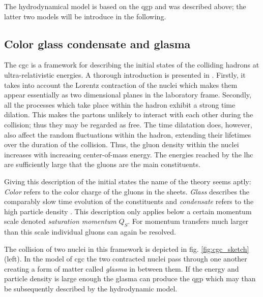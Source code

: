 The hydrodynamical model is based on the \gls{qgp} and was described above; the latter two models will be introduce in the following.


\subsection{Color glass condensate and glasma}
\label{sec:CGC}

The \gls{cgc} is a framework for describing the initial states of the colliding hadrons at ultra-relativistic energies. A thorough introduction is presented in \cite{Gelis2013}. Firstly, it takes into account the Lorentz contraction of the nuclei which makes them appear essentially as two dimensional planes in the laboratory frame. Secondly, all the processes which take place within the hadron exhibit a strong time dilation. This makes the partons unlikely to interact with each other during the collision; thus they may be regarded as free. The time dilatation does, however, also affect the random fluctuations within the hadron, extending their lifetimes over the duration of the collision. Thus, the gluon density within the nuclei increases with increasing center-of-mass energy. The energies reached by the \gls{lhc} are sufficiently large that the gluons are the main constituents.

Giving this description of the initial states the name of the theory seems aptly: \emph{Color} refers to the color charge of the gluons in the sheets. \emph{Glass} describes the comparably slow time evolution of the constituents and \emph{condensate} refers to the high particle density \cite{Wojciech2010}. This description only applies below a certain momentum scale denoted \emph{saturation momentum} $Q_S$. For momentum transfers much larger than this scale individual gluons can again be resolved.

The collision of two nuclei in this framework is depicted in fig. \ref{fig:cgc_sketch} (left). In the model of \gls{cgc} the two contracted nuclei pass through one another creating a form of matter called \emph{glasma} in between them. If the energy and particle density is large enough the glasma can produce the \gls{qgp} which may than be subsequently described by the hydrodynamic model.

